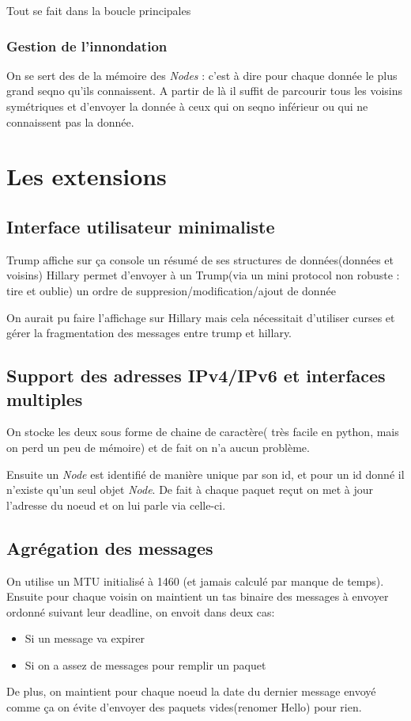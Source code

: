 \documentclass{report}
\begin{document}
Tout se fait dans la boucle principales

\subsubsection{Gestion de l'innondation}
On se sert des de la mémoire des \textit{Nodes} : c'est à dire pour chaque donnée le plus grand seqno qu'ils connaissent.
A partir de là il suffit de parcourir tous les voisins symétriques et d'envoyer la donnée à ceux qui on seqno inférieur ou qui ne connaissent pas la donnée.

\section{Les extensions}
\subsection{Interface utilisateur minimaliste}
Trump affiche sur ça console un résumé de ses structures de données(données et voisins)
Hillary permet d'envoyer à un Trump(via un mini protocol non robuste : tire et oublie) un ordre de suppresion/modification/ajout de donnée

On aurait pu faire l'affichage sur Hillary mais cela nécessitait d'utiliser curses et gérer la fragmentation des messages entre trump et hillary.

\subsection{Support des adresses IPv4/IPv6 et interfaces multiples}
On stocke les deux sous forme de chaine de caractère( très facile en python, mais on perd un peu de mémoire) et de fait on n'a aucun problème.

Ensuite un \textit{Node} est identifié de manière unique par son id, et pour un id donné il n'existe qu'un seul objet \textit{Node}. De fait 
à chaque paquet reçut on met à jour l'adresse du noeud et on lui parle via celle-ci.

\subsection{Agrégation des messages}
On utilise un MTU initialisé à 1460 (et jamais calculé par manque de temps). 
Ensuite pour chaque voisin on maintient un tas binaire des messages à envoyer ordonné suivant leur deadline, on envoit dans deux cas:
  \begin{itemize}
   \item Si un message va expirer
   \item Si on a assez de messages pour remplir un paquet
  \end{itemize}
De plus, on maintient pour chaque noeud la date du dernier message envoyé comme ça on évite d'envoyer des paquets vides(renomer Hello) pour rien.
\end{document}
